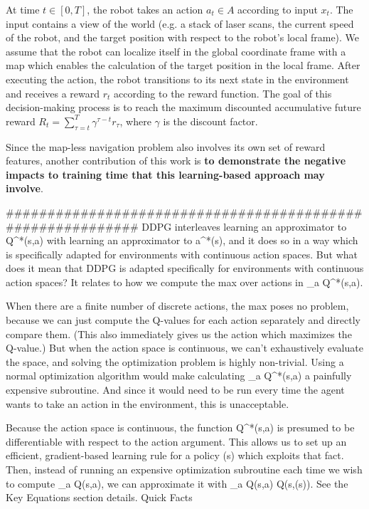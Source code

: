 At time $t \in [0, T]$, the robot takes an action $a_{t} \in A$ according to input $x_{t}$. The input contains a view of the world (e.g. a stack of laser scans, the current speed of the robot, and the target position with respect to the robot's local frame). We assume that the robot can localize itself in the global coordinate frame with a map which enables the calculation of the target position in the local frame. After executing the action, the robot transitions to its next state in the environment and receives a reward $r_{t}$ according to the reward function. The goal of this decision-making process is to reach the maximum discounted accumulative future reward $R_{t} = \sum_{\tau = t}^{T} \gamma^{\tau - t} r_{\tau}$, where $\gamma$ is the discount factor.

Since the map-less navigation problem also involves its own set of reward features, another contribution of this work is \textbf{to demonstrate the negative impacts to training time that this learning-based approach may involve}.



###########################################################
DDPG interleaves learning an approximator to Q^*(s,a) with learning an approximator to a^*(s), and it does so in a way which is specifically adapted for environments with continuous action spaces. But what does it mean that DDPG is adapted specifically for environments with continuous action spaces? It relates to how we compute the max over actions in \max_a Q^*(s,a).

When there are a finite number of discrete actions, the max poses no problem, because we can just compute the Q-values for each action separately and directly compare them. (This also immediately gives us the action which maximizes the Q-value.) But when the action space is continuous, we can't exhaustively evaluate the space, and solving the optimization problem is highly non-trivial. Using a normal optimization algorithm would make calculating \max_a Q^*(s,a) a painfully expensive subroutine. And since it would need to be run every time the agent wants to take an action in the environment, this is unacceptable.

Because the action space is continuous, the function Q^*(s,a) is presumed to be differentiable with respect to the action argument. This allows us to set up an efficient, gradient-based learning rule for a policy \mu(s) which exploits that fact. Then, instead of running an expensive optimization subroutine each time we wish to compute \max_a Q(s,a), we can approximate it with \max_a Q(s,a) \approx Q(s,\mu(s)). See the Key Equations section details.
Quick Facts

